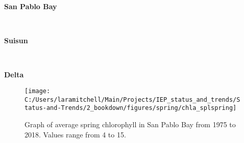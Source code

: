\documentclass[
]{book}
\begin{document}
\begin{panel-grid}

\begin{columns-nocenter}

\begin{column800}

\textbf{San Pablo Bay}

\end{column800}

\begin{column40}

~

\end{column40}

\begin{column800}

\textbf{Suisun}

\end{column800}

\begin{column40}

~

\end{column40}

\begin{column800}

\textbf{Delta}

\end{column800}

\end{columns-nocenter}

\begin{columns-nocenter}

\begin{column800}

\begin{expand}

\begin{figure}
\texttt{[image: C:/Users/laramitchell/Main/Projects/IEP\_status\_and\_trends/Status-and-Trends/2\_bookdown/figures/spring/chla\_splspring]} \caption{Graph of average spring chlorophyll in San Pablo Bay from 1975 to 2018. Values range from 4 to 15.}\label{fig:unnamed-chunk-20}
\end{figure}

\end{expand}

\end{column800}

\begin{column40}

~


\end{column40}
\end{columns-nocenter}
\end{panel-grid}
\end{document}
